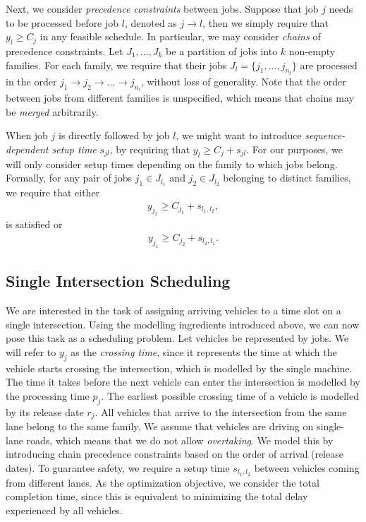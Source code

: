 \documentclass{article}
\theoremstyle{definition}
\theoremstyle{plain}
\begin{document}
Next, we consider \textit{precedence constraints} between jobs. Suppose that job
$j$ needs to be processed before job $l$, denoted as $j \rightarrow{} l$, then
we simply require that $y_{l} \geq C_{j}$ in any feasible schedule. In
particular, we may consider \textit{chains} of precedence constraints. Let
$J_{1}, \dots, J_{k}$ be a partition of jobs into $k$ non-empty families. For
each family, we require that their jobs $J_{l} = \{ j_{1}, \dots, j_{n_{l}}\}$
are processed in the order
$j_{1} \rightarrow{} j_{2} \rightarrow{} \dots \rightarrow{} j_{n_{l}}$, without
loss of generality. Note that the order between jobs from different families is
unspecified, which means that chains may be \textit{merged} arbitrarily.

When job $j$ is directly followed by job $l$, we might want to introduce
\textit{sequence-dependent setup time} $s_{jl}$, by requiring that
$y_{l} \geq C_{j} + s_{jl}$. For our purposes, we will only consider setup times
depending on the family to which jobs belong. Formally, for any pair of jobs
$j_{1} \in J_{l_{1}}$ and $j_{2} \in J_{l_{2}}$ belonging to distinct families, we
require that either
\begin{align*}
y_{j_{2}} \geq C_{j_{1}} + s_{l_{1},l_{2}} ,
\end{align*}
is satisfied or
\begin{align*}
y_{j_{1}} \geq C_{j_{2}} + s_{l_{2},l_{1}} .
\end{align*}

\subsection{Single Intersection Scheduling}

We are interested in the task of assigning arriving vehicles to a time slot on a
single intersection. Using the modelling ingredients introduced above, we can
now pose this task as a scheduling problem. Let vehicles be represented by jobs.
We will refer to $y_{j}$ as the \textit{crossing time}, since it represents the
time at which the vehicle starts crossing the intersection, which is modelled by
the single machine. The time it takes before the next vehicle can enter the
intersection is modelled by the processing time $p_{j}$. The earliest possible
crossing time of a vehicle is modelled by its release date $r_{j}$. All vehicles
that arrive to the intersection from the same lane belong to the same family. We
assume that vehicles are driving on single-lane roads, which means that we do
not allow \textit{overtaking}. We model this by introducing chain precedence
constraints based on the order of arrival (release dates). To guarantee safety,
we require a setup time $s_{l_{1},l_{2}}$ between vehicles coming from different
lanes. As the optimization objective, we consider the total completion time,
since this is equivalent to minimizing the total delay experienced by all
vehicles.
\end{document}
